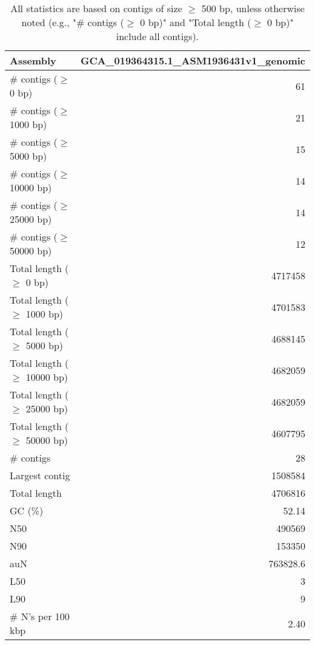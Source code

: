 \documentclass[12pt,a4paper]{article}
\begin{document}
\begin{table}[ht]
\begin{center}
\caption{All statistics are based on contigs of size $\geq$ 500 bp, unless otherwise noted (e.g., "\# contigs ($\geq$ 0 bp)" and "Total length ($\geq$ 0 bp)" include all contigs).}
\begin{tabular}{|l*{1}{|r}|}
\hline
Assembly & GCA\_019364315.1\_ASM1936431v1\_genomic \\ \hline
\# contigs ($\geq$ 0 bp) & 61 \\ \hline
\# contigs ($\geq$ 1000 bp) & 21 \\ \hline
\# contigs ($\geq$ 5000 bp) & 15 \\ \hline
\# contigs ($\geq$ 10000 bp) & 14 \\ \hline
\# contigs ($\geq$ 25000 bp) & 14 \\ \hline
\# contigs ($\geq$ 50000 bp) & 12 \\ \hline
Total length ($\geq$ 0 bp) & 4717458 \\ \hline
Total length ($\geq$ 1000 bp) & 4701583 \\ \hline
Total length ($\geq$ 5000 bp) & 4688145 \\ \hline
Total length ($\geq$ 10000 bp) & 4682059 \\ \hline
Total length ($\geq$ 25000 bp) & 4682059 \\ \hline
Total length ($\geq$ 50000 bp) & 4607795 \\ \hline
\# contigs & 28 \\ \hline
Largest contig & 1508584 \\ \hline
Total length & 4706816 \\ \hline
GC (\%) & 52.14 \\ \hline
N50 & 490569 \\ \hline
N90 & 153350 \\ \hline
auN & 763828.6 \\ \hline
L50 & 3 \\ \hline
L90 & 9 \\ \hline
\# N's per 100 kbp & 2.40 \\ \hline
\end{tabular}
\end{center}
\end{table}
\end{document}
